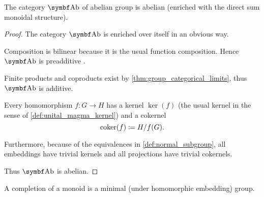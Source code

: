 \begin{proposition}\label{thm:ab_is_abelian}
  The category \( \Cat{Ab} \) of abelian group is abelian (enriched with the direct sum monoidal structure).
\end{proposition}
\begin{proof}
  The category \( \Cat{Ab} \) is enriched over itself in an obvious way.

  Composition is bilinear because it is the usual function composition. Hence \( \Cat{Ab} \) is preadditive .

  Finite products and coproducts exist by \cref{thm:group_categorical_limits}, thus \( \Cat{Ab} \) is additive.

  Every homomorphism \( f: G \to H \) has a kernel \( \ker(f) \) (the usual kernel in the sense of \cref{def:unital_magma_kernel}) and a cokernel
  \begin{equation*}
    \operatorname{co}\!\ker(f) \coloneqq H / f(G).
  \end{equation*}

  Furthermore, because of the equivalences in \cref{def:normal_subgroup}, all embeddings have trivial kernels and all projections have trivial cokernels.

  Thus \( \Cat{Ab} \) is abelian.
\end{proof}

\begin{definition}\label{def:monoid_completion}
  A completion of a monoid is a minimal (under homomorphic embedding) group.
\end{definition}

